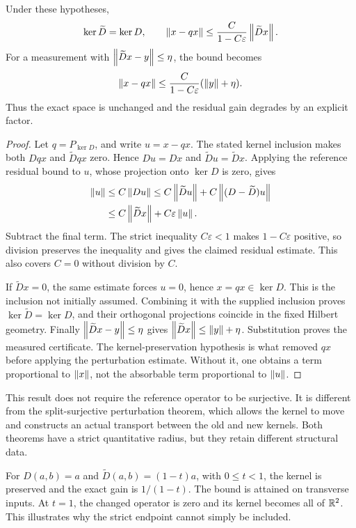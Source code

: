 \begin{KStheorem}\label{KS:KS70}
Under these hypotheses,
\[
 \ker\widetilde D=\ker D,
 \qquad
 \left\lVert x-qx\right\rVert\le\frac{C}{1-C\varepsilon}\left\lVert\widetilde D x\right\rVert.
\]
For a measurement with \(\left\lVert\widetilde D x-y\right\rVert\le\eta\), the bound becomes
\[
 \left\lVert x-qx\right\rVert\le\frac{C}{1-C\varepsilon}(\left\lVert y\right\rVert+\eta).
\]
Thus the exact space is unchanged and the residual gain degrades by an explicit factor.
\end{KStheorem}
\begin{proof}
Let \(q=P_{\ker D}\), and write \(u=x-qx\). The stated kernel inclusion makes both \(Dqx\) and \(\widetilde Dqx\) zero. Hence \(Du=Dx\) and \(\widetilde Du=\widetilde Dx\). Applying the reference residual bound to \(u\), whose projection onto \(\ker D\) is zero, gives
\[
 \begin{aligned}
 \left\lVert u\right\rVert&\le C\left\lVert Du\right\rVert
 \le C\left\lVert\widetilde Du\right\rVert+C\left\lVert(D-\widetilde D)u\right\rVert\\
 &\le C\left\lVert\widetilde Dx\right\rVert+C\varepsilon\left\lVert u\right\rVert.
 \end{aligned}
\]
Subtract the final term. The strict inequality \(C\varepsilon<1\) makes \(1-C\varepsilon\) positive, so division preserves the inequality and gives the claimed residual estimate. This also covers \(C=0\) without division by \(C\).

If \(\widetilde Dx=0\), the same estimate forces \(u=0\), hence \(x=qx\in\ker D\). This is the inclusion not initially assumed. Combining it with the supplied inclusion proves \(\ker\widetilde D=\ker D\), and their orthogonal projections coincide in the fixed Hilbert geometry. Finally \(\left\lVert\widetilde Dx-y\right\rVert\le\eta\) gives \(\left\lVert\widetilde Dx\right\rVert\le\left\lVert y\right\rVert+\eta\). Substitution proves the measured certificate. The kernel-preservation hypothesis is what removed \(qx\) before applying the perturbation estimate. Without it, one obtains a term proportional to \(\left\lVert x\right\rVert\), not the absorbable term proportional to \(\left\lVert u\right\rVert\).
\end{proof}
This result does not require the reference operator to be surjective. It is different from the split-surjective perturbation theorem, which allows the kernel to move and constructs an actual transport between the old and new kernels. Both theorems have a strict quantitative radius, but they retain different structural data.

For \(D(a,b)=a\) and \(\widetilde D(a,b)=(1-t)a\), with \(0\le t<1\), the kernel is preserved and the exact gain is \(1/(1-t)\). The bound is attained on transverse inputs. At \(t=1\), the changed operator is zero and its kernel becomes all of \(\mathbb R^2\). This illustrates why the strict endpoint cannot simply be included.

